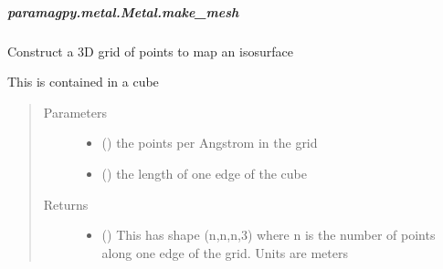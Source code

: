 \documentclass[a4paper,10pt,english,openany,oneside]{sphinxmanual}
\begin{document}
\begin{fulllineitems}
\begin{fulllineitems}
\begin{fulllineitems}
\label{\detokenize{reference/generated/paramagpy.metal.Metal.isomap:paramagpy.metal.Metal.isomap}}
\end{fulllineitems}



\subparagraph{paramagpy.metal.Metal.make\_mesh}
\label{\detokenize{reference/generated/paramagpy.metal.Metal.make_mesh:paramagpy-metal-metal-make-mesh}}\label{\detokenize{reference/generated/paramagpy.metal.Metal.make_mesh::doc}}

\begin{fulllineitems}
\label{\detokenize{reference/generated/paramagpy.metal.Metal.make_mesh:paramagpy.metal.Metal.make_mesh}}
Construct a 3D grid of points to map an isosurface

This is contained in a cube
\begin{quote}\begin{description}
\item[{Parameters}] \leavevmode\begin{itemize}
\item {} 
 (\sphinxstyleliteralemphasis{\sphinxupquote{ (}}\sphinxstyleliteralemphasis{\sphinxupquote{)}}) \textendash{} the points per Angstrom in the grid

\item {} 
 (\sphinxstyleliteralemphasis{\sphinxupquote{ (}}\sphinxstyleliteralemphasis{\sphinxupquote{)}}) \textendash{} the length of one edge of the cube

\end{itemize}

\item[{Returns}] \leavevmode
\begin{itemize}
\item {} 
 () \textendash{} This has shape (n,n,n,3) where n is the number of points
along one edge of the grid. Units are meters


\end{itemize}
\end{description}
\end{quote}
\end{fulllineitems}
\end{fulllineitems}
\end{fulllineitems}
\end{document}
